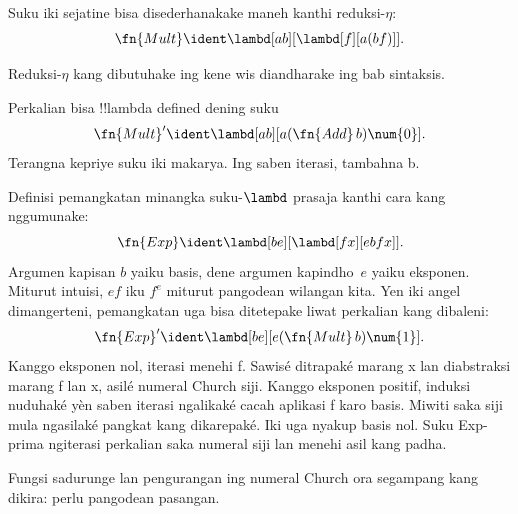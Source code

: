 \documentclass[../../../include/open-logic-section]{subfiles}
\begin{document}
\begin{editorial}
Suku iki sejatine bisa
disederhanakake maneh
kanthi reduksi-$\eta$:
\[
  \fn{Mult} \ident \lambd[ab][\lambd[f][a (b f)]].
\]

Reduksi-$\eta$ kang
dibutuhake ing kene wis
diandharake ing bab sintaksis.
\end{editorial}

\begin{prob}
Perkalian bisa
!!{lambda define}d
dening suku
\[
  \fn{Mult}' \ident \lambd[ab][a (\fn{Add}\, b) \num{0}].
\]
Terangna kepriye
suku iki makarya.
Ing saben iterasi, tambahna b.\end{prob}

Definisi pemangkatan
minangka suku-$\lambd$
prasaja kanthi cara
kang nggumunake:
\[
  \fn{Exp} \ident \lambd[be][\lambd[fx][e b f x]].
\]
Argumen kapisan $b$
yaiku basis, dene
argumen kapindho~$e$
yaiku eksponen.
Miturut intuisi,
$e f$ iku $f^e$
miturut pangodean
wilangan kita.
Yen iki angel dimangerteni,
pemangkatan uga bisa
ditetepake liwat
perkalian kang dibaleni:
\[
  \fn{Exp}' \ident \lambd[be][e (\fn{Mult}\, b) \num{1}].
\] Kanggo eksponen nol, iterasi menehi f. Sawisé ditrapaké marang x lan diabstraksi marang f lan x, asilé numeral Church siji. Kanggo eksponen positif, induksi nuduhaké yèn saben iterasi ngalikaké cacah aplikasi f karo basis. Miwiti saka siji mula ngasilaké pangkat kang dikarepaké. Iki uga nyakup basis nol. Suku Exp-prima ngiterasi perkalian saka numeral siji lan menehi asil kang padha.

Fungsi sadurunge lan
pengurangan ing numeral
Church ora segampang
kang dikira: perlu
pangodean pasangan.
\end{document}
